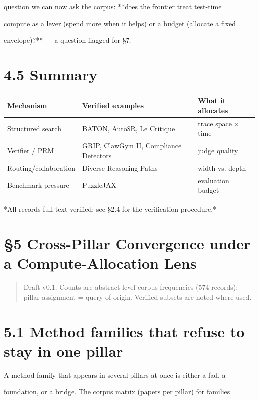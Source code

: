 \documentclass[11pt]{article}
\begin{document}
question we can now ask the corpus: **does the frontier treat test-time

compute as a lever (spend more when it helps) or a budget (allocate a fixed

envelope)?** --- a question flagged for \S7.


\section{4.5 Summary}

\begin{table}[h]\centering\begin{tabular}{lll}
\hline
Mechanism & Verified examples & What it allocates \\
\hline
Structured search & BATON, AutoSR, Le Critique & trace space $\times$ time \\
Verifier / PRM & GRIP, ClawGym II, Compliance Detectors & judge quality \\
Routing/collaboration & Diverse Reasoning Paths & width vs. depth \\
Benchmark pressure & PuzzleJAX & evaluation budget \\
\hline\end{tabular}\end{table}


*All records full-text verified; see \S2.4 for the verification procedure.*



\section*{\S5 Cross-Pillar Convergence under a Compute-Allocation Lens}

\begin{quote}Draft v0.1. Counts are abstract-level corpus frequencies (574 records); pillar assignment = query of origin. Verified subsets are noted where used.\end{quote}

\section{5.1 Method families that refuse to stay in one pillar}

A method family that appears in several pillars at once is either a fad, a

foundation, or a bridge. The corpus matrix (papers per pillar) for families
\end{document}
